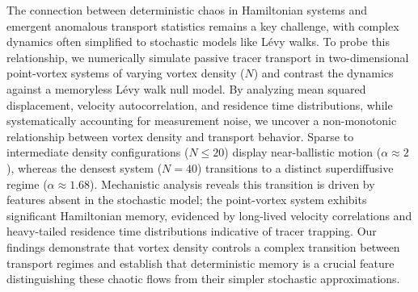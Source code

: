\documentclass[]{article}
\begin{document}
The connection between deterministic chaos in Hamiltonian systems and emergent anomalous transport statistics remains a key challenge, with complex dynamics often simplified to stochastic models like Lévy walks. To probe this relationship, we numerically simulate passive tracer transport in two-dimensional point-vortex systems of varying vortex density ($N$) and contrast the dynamics against a memoryless Lévy walk null model. By analyzing mean squared displacement, velocity autocorrelation, and residence time distributions, while systematically accounting for measurement noise, we uncover a non-monotonic relationship between vortex density and transport behavior. Sparse to intermediate density configurations ($N \le 20$) display near-ballistic motion ($\alpha \approx 2$), whereas the densest system ($N=40$) transitions to a distinct superdiffusive regime ($\alpha \approx 1.68$). Mechanistic analysis reveals this transition is driven by features absent in the stochastic model; the point-vortex system exhibits significant Hamiltonian memory, evidenced by long-lived velocity correlations and heavy-tailed residence time distributions indicative of tracer trapping. Our findings demonstrate that vortex density controls a complex transition between transport regimes and establish that deterministic memory is a crucial feature distinguishing these chaotic flows from their simpler stochastic approximations.
\end{document}
